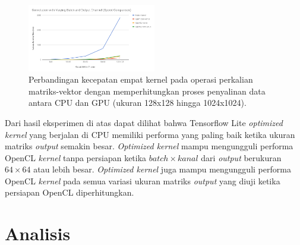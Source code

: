 \begin{figure}
	\centering
	\includegraphics[width=0.50\textwidth]
	{pics/convvarbchn.png}
	\caption{Perbandingan kecepatan empat kernel pada operasi perkalian matriks-vektor dengan memperhitungkan proses penyalinan data antara CPU dan GPU (ukuran 128x128 hingga 1024x1024).}
	\label{fig:convvarbchn}
\end{figure}

Dari hasil eksperimen di atas dapat dilihat bahwa Tensorflow Lite \textit{optimized kernel} yang berjalan di CPU memiliki performa yang paling baik ketika ukuran matriks \textit{output} semakin besar. \textit{Optimized kernel} mampu mengungguli performa OpenCL \textit{kernel} tanpa persiapan ketika $batch \times kanal$ dari \textit{output} berukuran $64 \times 64$ atau lebih besar. \textit{Optimized kernel} juga mampu mengungguli performa OpenCL \textit{kernel} pada semua variasi ukuran matriks \textit{output} yang diuji ketika persiapan OpenCL diperhitungkan.

\section{Analisis }
